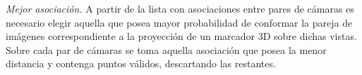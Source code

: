 \textit{Mejor asociación.}\label{MejorAsociacion}
%
A partir de la lista con asociaciones entre pares de cámaras es necesario elegir aquella que posea mayor probabilidad de conformar la pareja de imágenes correspondiente a la proyección de un marcador 3D sobre dichas vistas.
%
Sobre cada par de cámaras se toma aquella asociación que posea la menor distancia y contenga puntos válidos, descartando las restantes. %
%
